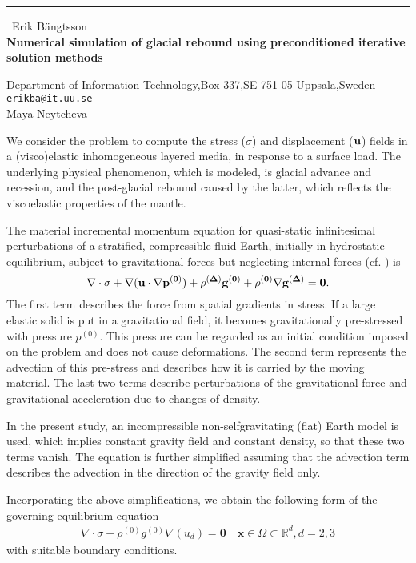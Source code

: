 \documentclass{report}
\begin{document}
\begin{center}
\rule{6in}{1pt} \
{\large Erik B{\"a}ngtsson \\
{\bf Numerical simulation of glacial rebound using preconditioned iterative solution methods}}

Department of Information Technology,Box 337,SE-751 05 Uppsala,Sweden
\\
{\tt erikba@it.uu.se}\\
Maya Neytcheva\end{center}

We consider the problem to compute the stress ($\sigma$) and
displacement ($\bf{u}$) fields in a (visco)elastic inhomogeneous layered
media, in response to a surface load. The underlying physical phenomenon,
which is modeled, is glacial advance and recession, and the post-glacial
rebound caused by the latter, which reflects the viscoelastic properties
of the mantle.

The material incremental momentum equation for quasi-static infinitesimal
perturbations of a stratified, compressible fluid Earth, initially in
hydrostatic equilibrium, subject to gravitational forces but neglecting
internal forces (cf. \cite{KlemannWuWolf}) is
\[
\nabla \cdot \sigma + \nabla(\bf{u}\cdot\nabla
p^{(0)})+\rho^{(\Delta)}\bf{g}^{(0)} + \rho^{(0)}\nabla\bf{g}^{(\Delta)}
= \bf{0}.
\]
The first term describes the force from spatial gradients in
stress. If a large elastic solid is put in a gravitational field, it
becomes gravitationally pre-stressed with pressure $p^{(0)}$. This
pressure can be regarded as an initial condition imposed on the problem
and does not cause deformations. The second term represents the advection
of this pre-stress and describes how it is carried by the moving
material. The last two terms describe perturbations of the
gravitational force and gravitational acceleration due to changes of density.

In the present study, an incompressible non-selfgravitating (flat) Earth
model is used, which implies constant gravity field and constant density,
so that these two terms vanish. The equation is further simplified
assuming that the advection term describes the advection in the direction
of the gravity field only.

Incorporating the above simplifications, we obtain the following form of
the governing equilibrium equation
\begin{equation}\begin{array}{l}
\nabla\cdot \sigma +
\rho^{(0)}g^{(0)} \nabla(u_d) = \mathbf{0} \quad
\mathbf{x}\in\Omega\subset\mathbb{R}^d, d=2,3
\end{array}\label{eq_rebound2}
\end{equation}
with suitable boundary conditions.
\end{document}
